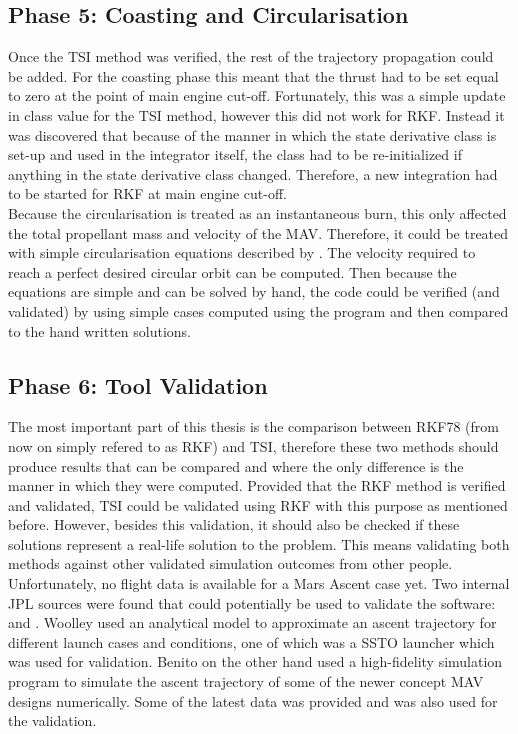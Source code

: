 \subsection{Phase 5: Coasting and Circularisation}
\label{subsec:phase5com}
Once the \ac{TSI} method was verified, the rest of the trajectory propagation could be added. For the coasting phase this meant that the thrust had to be set equal to zero at the point of main engine cut-off. Fortunately, this was a simple update in class value for the \ac{TSI} method, however this did not work for \ac{RKF}. Instead it was discovered that because of the manner in which the state derivative class is set-up and used in the integrator itself, the class had to be re-initialized if anything in the state derivative class changed. Therefore, a new integration had to be started for \ac{RKF} at main engine cut-off. \\

\noindent
Because the circularisation is treated as an instantaneous burn, this only affected the total propellant mass and velocity of the \ac{MAV}. Therefore, it could be treated with simple circularisation equations described by \cite{wakker2010}. The velocity required to reach a perfect desired circular orbit can be computed. Then because the equations are simple and can be solved by hand, the code could be verified (and validated) by using simple cases computed using the program and then compared to the hand written solutions. 

\subsection{Phase 6: Tool Validation}
\label{subsec:phase6com}
The most important part of this thesis is the comparison between \ac{RKF78} (from now on simply refered to as \ac{RKF}) and \ac{TSI}, therefore these two methods should produce results that can be compared and where the only difference is the manner in which they were computed. Provided that the \ac{RKF} method is verified and validated, \ac{TSI} could be validated using \ac{RKF} with this purpose as mentioned before. However, besides this validation, it should also be checked if these solutions represent a real-life solution to the problem. This means validating both methods against other validated simulation outcomes from other people. Unfortunately, no flight data is available for a Mars Ascent case yet. Two internal \ac{JPL} sources were found that could potentially be used to validate the software: \cite{woolley2015simple} and \cite{benito2016trajectory}. Woolley used an analytical model to approximate an ascent trajectory for different launch cases and conditions, one of which was a \ac{SSTO} launcher which was used for validation. Benito on the other hand used a high-fidelity simulation program to simulate the ascent trajectory of some of the newer concept \ac{MAV} designs numerically. Some of the latest data was provided and was also used for the validation.\\

